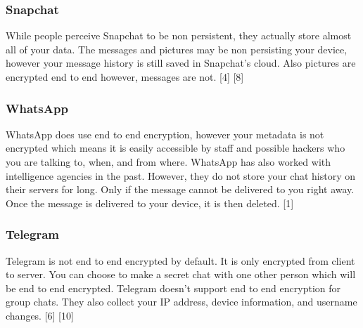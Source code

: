 \documentclass[11pt]{article}
\theoremstyle{plain}
\theoremstyle{definition}
\begin{document}
\subsubsection{Snapchat}
While people perceive Snapchat to be non persistent, they actually store almost all of your data. The messages and pictures may be non persisting your device, however your message history is still saved in Snapchat's cloud. Also pictures are encrypted end to end however, messages are not. [4] [8]
\subsubsection{WhatsApp}
WhatsApp does use end to end encryption, however your metadata is not encrypted which means it is easily accessible by staff and possible hackers who you are talking to, when, and from where. WhatsApp has also worked with intelligence agencies in the past. However, they do not store your chat history on their servers for long. Only if the message cannot be delivered to you right away. Once the message is delivered to your device, it is then deleted. [1]
\subsubsection{Telegram}
Telegram is not end to end encrypted by default. It is only encrypted from client to server. You can choose to make a secret chat with one other person which will be end to end encrypted. Telegram doesn't support end to end encryption for group chats. They also collect your IP address, device information, and username changes. [6] [10]
\newline \newline




\setlength{\tabcolsep}{4pt} %
\end{document}
